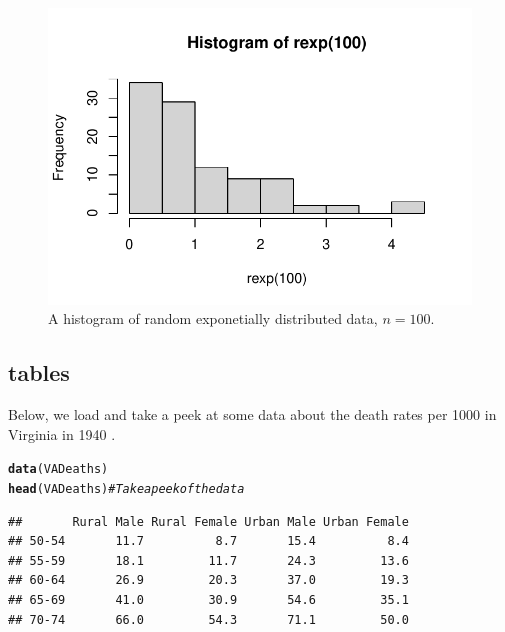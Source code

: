 \documentclass{article}\usepackage[]{graphicx}\usepackage[]{xcolor}
\makeatletter
\def\maxwidth{ %
  \ifdim\Gin@nat@width>\linewidth
    \linewidth
  \else
    \Gin@nat@width
  \fi
}
\newcommand{\hlcom}[1]{\textcolor[rgb]{0.678,0.584,0.686}{\textit{#1}}}%
\newcommand{\hldef}[1]{\textcolor[rgb]{0.345,0.345,0.345}{#1}}%
\newcommand{\hlkwd}[1]{\textcolor[rgb]{0.737,0.353,0.396}{\textbf{#1}}}%
\newenvironment{kframe}{%
 \def\at@end@of@kframe{}%
 \ifinner\ifhmode%
  \def\at@end@of@kframe{\end{minipage}}%
  \begin{minipage}{\columnwidth}%
 \fi\fi%
 \def\FrameCommand##1{\hskip\@totalleftmargin \hskip-\fboxsep
 \colorbox{shadecolor}{##1}\hskip-\fboxsep
     \hskip-\linewidth \hskip-\@totalleftmargin \hskip\columnwidth}%
 \MakeFramed {\advance\hsize-\width
   \@totalleftmargin\z@ \linewidth\hsize
   \@setminipage}}%
 {\par\unskip\endMakeFramed%
 \at@end@of@kframe}
\newenvironment{knitrout}{}{} %
\makeatother
\begin{document}
\begin{multicols}{2}
\begin{figure}[H]
  \begin{center}
\begin{knitrout}
\color{fgcolor}
\includegraphics[width=\maxwidth]{figure/unnamed-chunk-6-1} 
\end{knitrout}
\caption{A histogram of random exponetially distributed data, $n=100$.}
\label{plot1}
\end{center}
\end{figure} 

\columnbreak

\subsection{tables}
\noindent  Below, we load and take a peek at some data about the death rates per 1000 in Virginia in 1940 \citep{VADeaths}.

\begin{knitrout}\scriptsize
{}\color{fgcolor}\begin{kframe}
\begin{alltt}
\hlkwd{data}\hldef{(VADeaths)}
\hlkwd{head}\hldef{(VADeaths)} \hlcom{# Take a peek of the data}
\end{alltt}
\begin{verbatim}
##       Rural Male Rural Female Urban Male Urban Female
## 50-54       11.7          8.7       15.4          8.4
## 55-59       18.1         11.7       24.3         13.6
## 60-64       26.9         20.3       37.0         19.3
## 65-69       41.0         30.9       54.6         35.1
## 70-74       66.0         54.3       71.1         50.0
\end{verbatim}
\end{kframe}
\end{knitrout}


\end{multicols}
\end{document}
